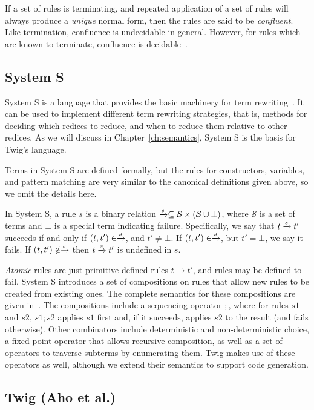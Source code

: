 If a set of rules is terminating, and repeated application of a
set of rules will always produce a \emph{unique} normal form, then
the rules are said to be \emph{confluent}. Like termination,
confluence is undecidable in general. However, for rules which are
known to terminate, confluence is decidable~\cite{baader98term}.

\subsection{System S}

System S is a language that provides the basic machinery for term
rewriting~\cite{visser98core}. It can be used to implement
different term rewriting strategies, that is, methods for deciding
which redices to reduce, and when to reduce them relative to other
redices. As we will discuss in Chapter~\ref{ch:semantics}, System
S is the basis for Twig's language.

Terms in System S are defined formally, but the rules for
constructors, variables, and pattern matching are very similar to
the canonical definitions given above, so we omit the details
here.

In System S, a rule $s$ is a binary relation $\xrightarrow{s} \subseteq
\mathcal{S} \times (\mathcal{S} \cup \bot )$, where $\mathcal{S}$
is a set of terms and $\bot$ is a special term indicating failure.
Specifically, we say that $t \xrightarrow{s} t'$ succeeds if and only if
$(t,t') \in \xrightarrow{s}$, and $t' \neq \bot$. If $(t,t') \in \xrightarrow{s}$,
but $t' = \bot$, we say it fails. If $(t,t') \notin \xrightarrow{s}$ then
$t \xrightarrow{s} t'$ is undefined in $s$.

\emph{Atomic} rules are just primitive defined rules $t \to t'$,
and rules may be defined to fail. System S introduces a set of
compositions on rules that allow new rules to be created from
existing ones. The complete semantics for these compositions are
given in~\cite{visser98core}. The compositions include a
sequencing operator $;$, where for rules $s1$ and $s2$, $s1;s2$
applies $s1$ first and, if it succeeds, applies $s2$ to the result
(and fails otherwise). Other combinators include deterministic and
non-deterministic choice, a fixed-point operator that allows
recursive composition, as well as a set of operators to traverse
subterms by enumerating them. Twig makes use of these operators as
well, although we extend their semantics to support code
generation.

\subsection{Twig (Aho et al.)}


